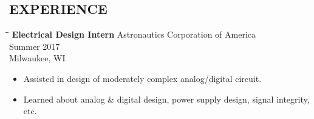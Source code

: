 \documentclass[letterpaper]{res}
\begin{document}
\begin{resume}

  \section{EXPERIENCE}
  \vspace{-0.15in}
  \begin{tabbing}
    \hspace{2.3in}\= \hspace{2.6in}\= \kill %
    {\bf Electrical Design Intern} \>Astronautics Corporation of America \> ~~~~~~ Summer 2017\\
    \> Milwaukee, WI
  \end{tabbing}\vspace{-10pt}
  \begin{itemize} \itemsep1pt \parskip0pt 
    \item Assisted in design of moderately complex analog/digital circuit.
    \item Learned about analog \& digital design, power supply design, signal integrity, etc.
  \end{itemize}


\end{resume}
\end{document}
